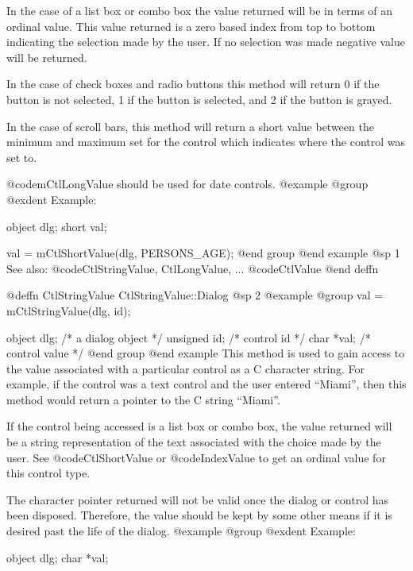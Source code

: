 In the case of a list box or combo box the value returned will be in
terms of an ordinal value. This value returned is a zero based index
from top to bottom indicating the selection made by the user.  If no
selection was made negative value will be returned.  

In the case of check boxes and radio buttons this method will return
0 if the button is not selected, 1 if the button is selected, and
2 if the button is grayed.

In the case of scroll bars, this method will return a short value
between the minimum and maximum set for the control which indicates
where the control was set to.

@code{mCtlLongValue} should be used for date controls.
@example
@group
@exdent Example:

object  dlg;
short   val;

val = mCtlShortValue(dlg, PERSONS_AGE);
@end group
@end example
@sp 1
See also:  @code{CtlStringValue, CtlLongValue, ...}
        @code{CtlValue}
@end deffn















@deffn {CtlStringValue} CtlStringValue::Dialog
@sp 2
@example
@group
val = mCtlStringValue(dlg, id);

object  dlg;    /*  a dialog object  */
unsigned id;    /*  control id       */
char    *val;   /*  control value    */
@end group
@end example
This method is used to gain access to the value associated with a
particular control as a C character string.  For example, if the control
was a text control and the user entered ``Miami'', then this method
would return a pointer to the C string ``Miami''.

If the control being accessed is a list box or combo box, the value
returned will be a string representation of the text associated with the
choice made by the user.  See @code{CtlShortValue} or @code{IndexValue}
to get an ordinal value for this control type.

The character pointer returned will not be valid once the dialog or
control has been disposed.  Therefore, the value should be kept by
some other means if it is desired past the life of the dialog.
@example
@group
@exdent Example:

object  dlg;
char    *val;

